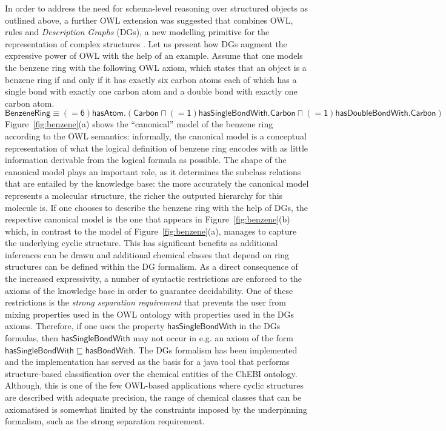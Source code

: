 \documentclass[10pt]{bmc_article}
\newenvironment{bmcformat}{\baselineskip20pt\sloppy\setboolean{publ}{false}}{\baselineskip20pt\sloppy}
\begin{document}
\begin{bmcformat}
In order to address the need for schema-level reasoning over structured objects as outlined above, a further OWL extension was suggested that combines OWL, rules and \emph{Description Graphs} (DGs), a new modelling primitive for the representation of complex structures  \cite{mghs09graphs-journal}. Let us present how DGs augment the expressive power of OWL with the help of an example. Assume that one models the benzene ring with the following OWL axiom, which states that an object is a benzene ring if and only if it has exactly six carbon atoms each of which has a single bond with exactly one carbon atom and a double bond with exactly one carbon atom. 
$$ \mathsf{BenzeneRing \equiv (= 6) hasAtom. (Carbon \sqcap (= 1) hasSingleBondWith.Carbon \sqcap (= 1) hasDoubleBondWith.Carbon)}$$
Figure~\ref{fig:benzene}(a) shows the ``canonical'' model of the benzene ring according to the OWL semantics: informally, the canonical model is a conceptual representation of what the logical definition of benzene ring encodes with as little information derivable from the logical formula as possible. The shape of the canonical model plays an important role, as it determines the subclass relations that are entailed by the knowledge base: the more accurately the canonical model represents a molecular structure, the richer the outputed hierarchy for this molecule is. If one chooses to describe the benzene ring with the help of DGs, the respective canonical model is the one that appears in Figure~\ref{fig:benzene}(b) which, in contrast to the model of Figure~\ref{fig:benzene}(a), manages to capture the underlying cyclic structure. This has significant benefits as additional inferences can be drawn and additional chemical classes that depend on ring structures can be defined within the DG formalism. As a direct consequence of the increased expressivity, a number of syntactic restrictions are enforced to the axioms of the knowledge base in order to guarantee decidability. One of these restrictions is the \emph{strong separation requirement} that prevents the user from mixing properties used in the OWL ontology with properties used in the DGs axioms. Therefore, if one uses the property $\mathsf{hasSingleBondWith}$ in the DGs formulas, then 
$\mathsf{hasSingleBondWith}$ may not occur in e.g. an axiom of the form $\mathsf{hasSingleBondWith} \sqsubseteq \mathsf{hasBondWith}$. The DGs formalism has been implemented and the implementation has served as the basis for a java tool that performs structure-based classification over the chemical entities of the ChEBI ontology. Although, this is one of the few OWL-based applications where cyclic structures are described with adequate precision, the range of chemical classes that can be axiomatised is somewhat limited by the constraints imposed by the underpinning formalism, such as the strong separation requirement.


\end{bmcformat}
\end{document}
